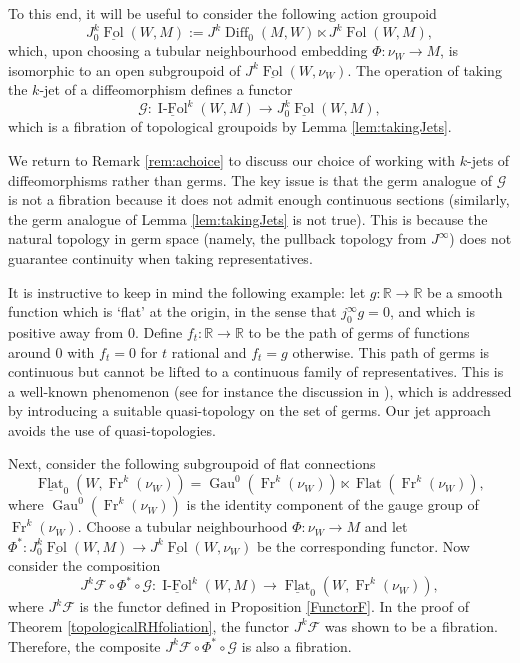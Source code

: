 \documentclass[10pt]{amsart}
\newcommand{\F}{{\mathcal{F}}}
\newcommand{\Diff}{{\operatorname{Diff}}}
\newcommand{\FolCat}{{\underline{\operatorname{Fol}}}}
\newcommand{\FolObj}{{\operatorname{Fol}}}
\newcommand{\FlatCat}{{\underline{\operatorname{Flat}}}}
\newcommand{\FlatObj}{{\operatorname{Flat}}}
\newcommand{\IsoCat}{\underline{\operatorname{I-Fol}}}
\newcommand{\Fr}{{\operatorname{Fr}}}
\newcommand{\G}{\mathcal{G}}
\DeclareMathOperator{\Gau}{Gau}
\numberwithin{theoremalpha}{section}
\numberwithin{equation}{section}
\numberwithin{definition}{section}
\numberwithin{theorem}{section}
\numberwithin{proposition}{section}
\numberwithin{lemma}{section}
\numberwithin{example}{section}
\numberwithin{remark}{section}
\numberwithin{corollary}{section}
\numberwithin{question}{section}
\numberwithin{problem}{section}
\numberwithin{assumption}{section}
\theoremstyle{named}
\numberwithin{equation}{section}
\begin{document}
To this end, it will be useful to consider the following action groupoid 
\[
J^{k}_{0}\FolCat(W,M) := J^k\Diff_0(M,W) \ltimes J^k\FolObj(W,M),
\]
which, upon choosing a tubular neighbourhood embedding $\Phi: \nu_{W} \to M$, is isomorphic to an open subgroupoid of $J^{k}\FolCat(W,\nu_{W})$. The operation of taking the $k$-jet of a diffeomorphism defines a functor 
\[ \mathcal{G} : \IsoCat^{k}(W,M)  \to J^{k}_{0}\FolCat(W,M), \]
which is a fibration of topological groupoids by Lemma \ref{lem:takingJets}. 


\begin{remark} \label{germproblem}
We return to Remark \ref{rem:achoice} to discuss our choice of working with $k$-jets of diffeomorphisms rather than germs. The key issue is that the germ analogue of $\G$ is not a fibration because it does not admit enough continuous sections (similarly, the germ analogue of Lemma \ref{lem:takingJets} is not true). This is because the natural topology in germ space (namely, the pullback topology from $J^\infty$) does not guarantee continuity when taking representatives.

It is instructive to keep in mind the following example: let $g: \mathbb{R} \to \mathbb{R}$ be a smooth function which is `flat' at the origin, in the sense that $j_0^{\infty} g = 0$, and which is positive away from $0$. Define $f_{t} : \mathbb{R} \to \mathbb{R}$ to be the path of germs of functions around $0$ with $f_{t} = 0$ for $t$ rational and $f_{t} = g$ otherwise. This path of germs is continuous but cannot be lifted to a continuous family of representatives. This is a well-known phenomenon (see for instance the discussion in \cite[p.35]{Gr86}), which is addressed by introducing a suitable quasi-topology on the set of germs. Our jet approach avoids the use of quasi-topologies. 
\end{remark}

Next, consider the following subgroupoid of flat connections  
\[ \FlatCat_0(W, \Fr^{k}(\nu_{W})) = \Gau^0(\Fr^k(\nu_{W})) \ltimes \FlatObj(\Fr^k(\nu_{W})), \]
where $\Gau^0(\Fr^k(\nu_{W}))$ is the identity component of the gauge group of $\Fr^k(\nu_{W})$. Choose a tubular neighbourhood $\Phi: \nu_{W} \to M$ and let $\Phi^{*} : J^{k}_{0}\FolCat(W,M) \to J^{k}\FolCat(W,\nu_{W})$ be the corresponding functor. Now consider the composition 
\[
J^{k}\F \circ \Phi^* \circ \mathcal{G} : \IsoCat^{k}(W,M) \to \FlatCat_0(W, \Fr^{k}(\nu_{W})),
\]
where $J^{k}\F$ is the functor defined in Proposition \ref{FunctorF}. In the proof of Theorem \ref{topologicalRHfoliation}, the functor $J^{k}\F$ was shown to be a fibration. Therefore, the composite $J^{k}\F \circ \Phi^* \circ \mathcal{G}$ is also a fibration. 
\end{document}
